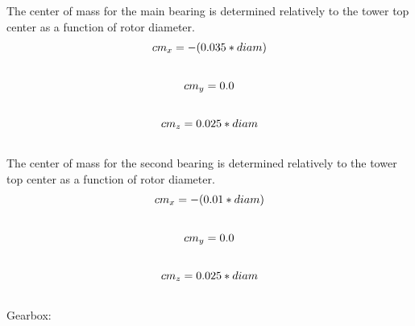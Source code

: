 \documentclass[letterpaper,10pt,openany,oneside]{sphinxmanual}
\begin{document}
The center of mass for the main bearing is determined relatively to the tower top center as a function of rotor diameter.
\begin{gather}
\begin{split}cm_{x} = -(0.035 * diam)\end{split}\notag\\\begin{split}\end{split}\notag
\end{gather}\begin{gather}
\begin{split}cm_{y} = 0.0\end{split}\notag\\\begin{split}\end{split}\notag
\end{gather}\begin{gather}
\begin{split}cm_{z} = 0.025 * diam\end{split}\notag\\\begin{split}\end{split}\notag
\end{gather}
The center of mass for the second bearing is determined relatively to the tower top center as a function of rotor diameter.
\begin{gather}
\begin{split}cm_{x} = -(0.01 * diam)\end{split}\notag\\\begin{split}\end{split}\notag
\end{gather}\begin{gather}
\begin{split}cm_{y} = 0.0\end{split}\notag\\\begin{split}\end{split}\notag
\end{gather}\begin{gather}
\begin{split}cm_{z} = 0.025 * diam\end{split}\notag\\\begin{split}\end{split}\notag
\end{gather}
Gearbox:
\end{document}
